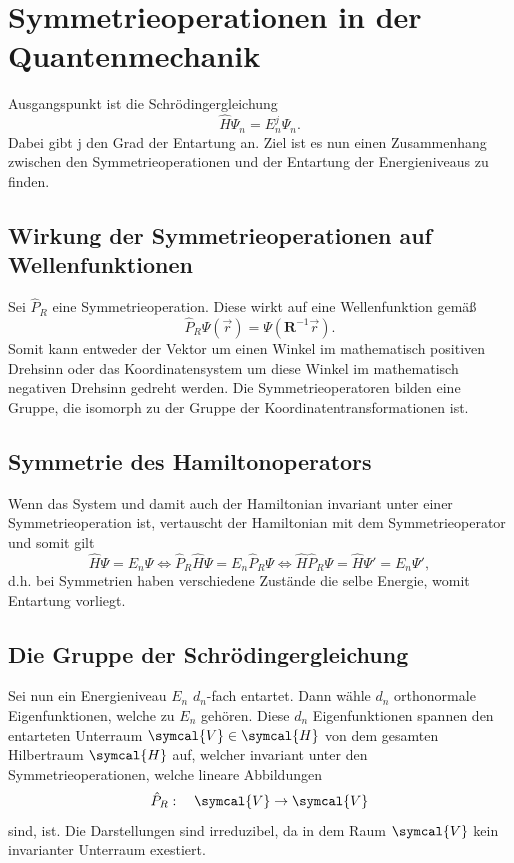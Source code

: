 \documentclass[
  captions=tableheading,  %
  titlepage=firstiscover, %
]{scrartcl}
\begin{document}
\section{Symmetrieoperationen in der Quantenmechanik}
Ausgangspunkt ist die Schrödingergleichung 
\begin{equation*}
  \hat {H} \Psi_n = E_n^j \Psi_n.
\end{equation*}
Dabei gibt j den Grad der Entartung an.
Ziel ist es nun einen Zusammenhang zwischen den Symmetrieoperationen und der Entartung der Energieniveaus 
zu finden.
\subsection{Wirkung der Symmetrieoperationen auf Wellenfunktionen}
Sei $\hat{P}_R$ eine Symmetrieoperation.
Diese wirkt auf eine Wellenfunktion gemäß
\begin{equation*}
  \hat{P}_R \Psi (\vec{r}) = \Psi(\mathbf{R}^{-1}\vec{r}).
\end{equation*}
Somit kann entweder der Vektor um einen Winkel im mathematisch positiven Drehsinn oder 
das Koordinatensystem um diese Winkel im mathematisch negativen Drehsinn gedreht werden.
Die Symmetrieoperatoren bilden eine Gruppe, die isomorph zu der Gruppe der 
Koordinatentransformationen ist.
\subsection{Symmetrie des Hamiltonoperators}
\label{sub:symmhamil}
Wenn das System und damit auch der Hamiltonian invariant unter einer Symmetrieoperation ist, vertauscht 
der Hamiltonian mit dem Symmetrieoperator und somit gilt 
\begin{equation*}
  \hat{H} \Psi = E_n \Psi \iff 
  \hat{P}_R \hat{H} \Psi = E_n \hat{P}_R \Psi \iff 
  \hat{H} \hat{P}_R \Psi = \hat{H} \Psi' = E_n \Psi',
\end{equation*}
d.h. bei Symmetrien haben verschiedene Zustände die selbe Energie, womit Entartung vorliegt.
\subsection{Die Gruppe der Schrödingergleichung}
\label{sub:schrdgroup}
Sei nun ein Energieniveau $E_n$ $d_n$-fach entartet.
Dann wähle $d_n$ orthonormale Eigenfunktionen, welche zu $E_n$ gehören.
Diese $d_n$ Eigenfunktionen spannen den entarteten Unterraum $\symcal{V} \in \symcal{H}$ 
von dem gesamten Hilbertraum $\symcal{H}$ auf, welcher invariant unter den Symmetrieoperationen, welche 
lineare Abbildungen 
\begin{equation*}
  \hat{P}_R: \quad \symcal{V} \to \symcal{V}
\end{equation*}
sind, ist.
Die Darstellungen sind irreduzibel, da in dem Raum $\symcal{V}$ kein invarianter Unterraum exestiert.
\end{document}
